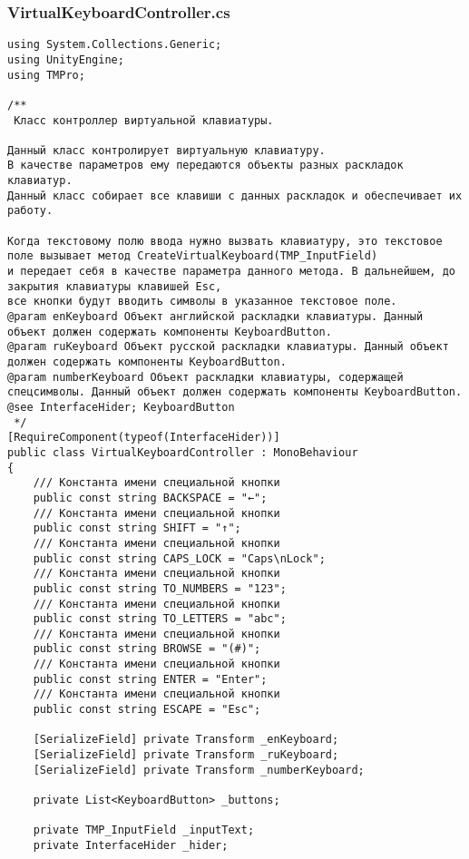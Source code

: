 \subsubsection*{VirtualKeyboardController.cs}
\begin{verbatim}
﻿using System.Collections.Generic;
using UnityEngine;
using TMPro;

/**
 Класс контроллер виртуальной клавиатуры.

Данный класс контролирует виртуальную клавиатуру.
В качестве параметров ему передаются объекты разных раскладок клавиатур.
Данный класс собирает все клавиши с данных раскладок и обеспечивает их работу.

Когда текстовому полю ввода нужно вызвать клавиатуру, это текстовое поле вызывает метод CreateVirtualKeyboard(TMP_InputField)
и передает себя в качестве параметра данного метода. В дальнейшем, до закрытия клавиатуры клавишей Esc, 
все кнопки будут вводить символы в указанное текстовое поле.
@param enKeyboard Объект английской раскладки клавиатуры. Данный объект должен содержать компоненты KeyboardButton.
@param ruKeyboard Объект русской раскладки клавиатуры. Данный объект должен содержать компоненты KeyboardButton.
@param numberKeyboard Объект раскладки клавиатуры, содержащей спецсимволы. Данный объект должен содержать компоненты KeyboardButton.
@see InterfaceHider; KeyboardButton
 */
[RequireComponent(typeof(InterfaceHider))]
public class VirtualKeyboardController : MonoBehaviour
{
    /// Константа имени специальной кнопки
    public const string BACKSPACE = "←";
    /// Константа имени специальной кнопки
    public const string SHIFT = "↑";
    /// Константа имени специальной кнопки
    public const string CAPS_LOCK = "Caps\nLock";
    /// Константа имени специальной кнопки
    public const string TO_NUMBERS = "123";
    /// Константа имени специальной кнопки
    public const string TO_LETTERS = "abc";
    /// Константа имени специальной кнопки
    public const string BROWSE = "(#)";
    /// Константа имени специальной кнопки
    public const string ENTER = "Enter";
    /// Константа имени специальной кнопки
    public const string ESCAPE = "Esc";

    [SerializeField] private Transform _enKeyboard;
    [SerializeField] private Transform _ruKeyboard;
    [SerializeField] private Transform _numberKeyboard;

    private List<KeyboardButton> _buttons;

    private TMP_InputField _inputText;
    private InterfaceHider _hider;


\end{verbatim}
